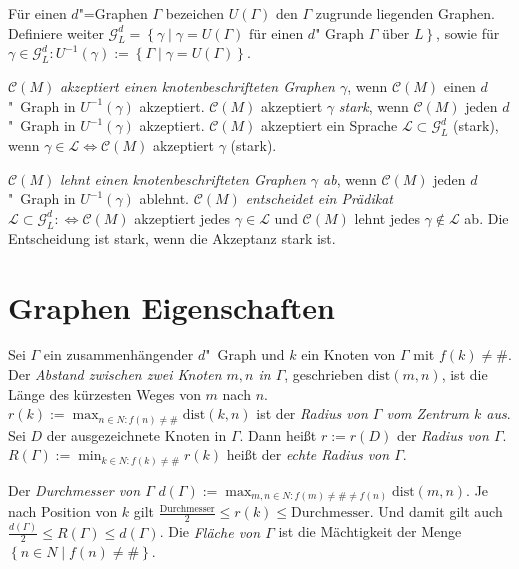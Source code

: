 \documentclass[11pt]{article}
\newcommand{\defWord}[1]{\emph{#1}}
\begin{document}
\begin{definition}
	Für einen $d$"=Graphen $\Gamma$ bezeichen $U\left(\Gamma\right)$ den $\Gamma$ zugrunde liegenden Graphen. 
	Definiere weiter $\mathcal{G}_L^d = \left\{\gamma \mid \gamma = U\left(\Gamma\right) \text{ für einen $d$"~Graph } \Gamma \text{ über } L\right\}$, sowie für $\gamma \in \mathcal{G}_L^d : U^{-1}\left(\gamma\right) := \left\{\Gamma \mid \gamma = U\left(\Gamma\right)\right\}$.
	
	$\mathcal{C}\left(M\right)$ \defWord{akzeptiert einen knotenbeschrifteten Graphen $\gamma$}, wenn $\mathcal{C}\left(M\right)$ einen $d$"~Graph in $U^{-1}\left(\gamma\right)$ akzeptiert.
	$\mathcal{C}\left(M\right)$ akzeptiert $\gamma$ \defWord{stark}, wenn $\mathcal{C}\left(M\right)$ jeden $d$"~Graph in $U^{-1}\left(\gamma\right)$ akzeptiert.
	$\mathcal{C}\left(M\right)$ akzeptiert ein Sprache $\mathcal{L} \subset \mathcal{G}_L^d$ (stark), wenn $\gamma \in \mathcal{L} \iff \mathcal{C}\left(M\right)$ akzeptiert $\gamma$ (stark). 
	
	$\mathcal{C}\left(M\right)$ \defWord{lehnt einen knotenbeschrifteten Graphen $\gamma$ ab}, wenn $\mathcal{C}\left(M\right)$ jeden $d$"~Graph in $U^{-1}\left(\gamma\right)$ ablehnt.
	$\mathcal{C}\left(M\right)$ \defWord{entscheidet ein Prädikat} $\mathcal{L} \subset \mathcal{G}_L^d :\iff \mathcal{C}\left(M\right)$ akzeptiert jedes $\gamma \in \mathcal{L}$ und $\mathcal{C}\left(M\right)$ lehnt jedes $\gamma \notin \mathcal{L}$ ab.
	Die Entscheidung ist stark, wenn die Akzeptanz stark ist. 
\end{definition}

\section{Graphen Eigenschaften}

\begin{definition}
	Sei $\Gamma$ ein zusammenhängender $d$"~Graph und $k$ ein Knoten von $\Gamma$ mit $f\left(k\right) \neq \#$.
	Der \defWord{Abstand zwischen zwei Knoten $m, n$ in $\Gamma$}, geschrieben $\text{dist}\left(m , n\right)$, ist die Länge des kürzesten Weges von $m$ nach $n$.
	$r\left(k\right) := \max_{n \in N : f\left(n\right) \neq \#} \text{dist}\left(k, n\right)$ ist der \defWord{Radius von $\Gamma$ vom Zentrum $k$ aus}.
	Sei $D$ der ausgezeichnete Knoten in $\Gamma$.
	Dann heißt $r := r\left(D\right)$ der \defWord{Radius von $\Gamma$}.
	$R\left(\Gamma\right) := \min_{k \in N : f\left(k\right) \neq \#} r\left(k\right)$ heißt der \defWord{echte Radius von $\Gamma$}.
	
	Der \defWord{Durchmesser von $\Gamma$} $d\left(\Gamma\right) := \max_{m, n \in N : f\left(m\right) \neq \# \neq f\left(n\right)} \text{dist}\left(m, n\right)$. Je nach Position von $k$ gilt $\frac{\text{Durchmesser}}{2} \le r\left(k\right) \le \text{Durchmesser}.$ Und damit gilt auch $\frac{d\left(\Gamma\right)}{2} \le R\left(\Gamma\right) \le d\left(\Gamma\right)$.
	Die \defWord{Fläche von $\Gamma$} ist die Mächtigkeit der Menge $ \left\{n \in N \mid f\left(n\right) \neq \# \right\}$.
	
\end{definition}
\end{document}
